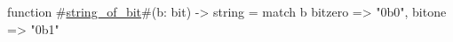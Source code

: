 function #\hyperref[sailRISCVzstringzyofzybit]{string\_of\_bit}#(b: bit) -> string =
  match b {
    bitzero => "0b0",
    bitone => "0b1"
  }
